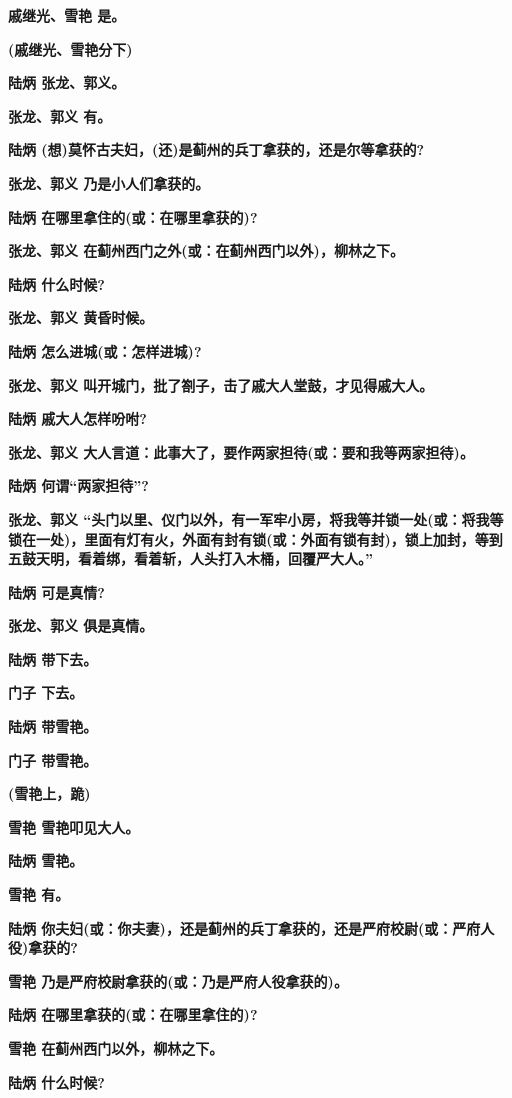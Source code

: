 \textbf{戚继光、雪艳 是。}

\textbf{(戚继光、雪艳分下)}

\textbf{陆炳 张龙、郭义。}

\textbf{张龙、郭义 有。}

\textbf{陆炳 (想)莫怀古夫妇，(还)是蓟州的兵丁拿获的，还是尔等拿获的?}

\textbf{张龙、郭义 乃是小人们拿获的。}

\textbf{陆炳 在哪里拿住的(或：在哪里拿获的)?}

\textbf{张龙、郭义 在蓟州西门之外(或：在蓟州西门以外)，柳林之下。}

\textbf{陆炳 什么时候?}

\textbf{张龙、郭义 黄昏时候。}

\textbf{陆炳 怎么进城(或：怎样进城)?}

\textbf{张龙、郭义 叫开城门，批了劄子，击了戚大人堂鼓，才见得戚大人。}

\textbf{陆炳 戚大人怎样吩咐?}

\textbf{张龙、郭义
大人言道：此事大了，要作两家担待(或：要和我等两家担待)。}

\textbf{陆炳 何谓``两家担待''?}

\textbf{张龙、郭义
``头门以里、仪门以外，有一军牢小房，将我等并锁一处(或：将我等锁在一处)，里面有灯有火，外面有封有锁(或：外面有锁有封)，锁上加封，等到五鼓天明，看着绑，看着斩，人头打入木桶，回覆严大人。''}

\textbf{陆炳 可是真情?}

\textbf{张龙、郭义 俱是真情。}

\textbf{陆炳 带下去。}

\textbf{门子 下去。}

\textbf{陆炳 带雪艳。}

\textbf{门子 带雪艳。}

\textbf{(雪艳上，跪)}

\textbf{雪艳 雪艳叩见大人。}

\textbf{陆炳 雪艳。}

\textbf{雪艳 有。}

\textbf{陆炳
你夫妇(或：你夫妻)，还是蓟州的兵丁拿获的，还是严府校尉(或：严府人役)拿获的?}

\textbf{雪艳 乃是严府校尉拿获的(或：乃是严府人役拿获的)。}

\textbf{陆炳 在哪里拿获的(或：在哪里拿住的)?}

\textbf{雪艳 在蓟州西门以外，柳林之下。}

\textbf{陆炳 什么时候?}

